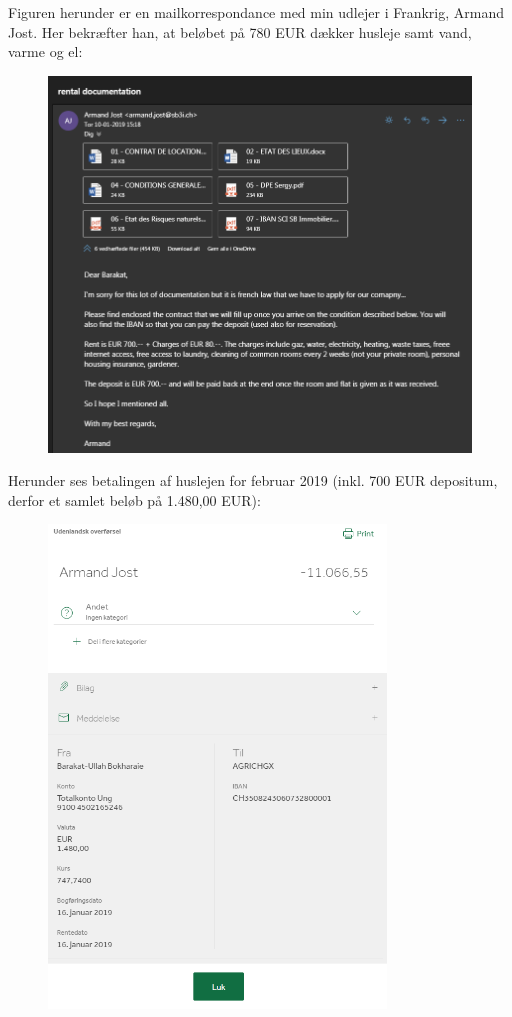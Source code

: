 \documentclass[../Ansoegning.tex]{subfiles}
\begin{document}
Figuren herunder er en mailkorrespondance med min udlejer i Frankrig, Armand Jost. Her bekræfter han, at beløbet på 780 EUR dækker husleje samt vand, varme og el:
\begin{figure}[H]
	\centering
	\includegraphics[width=1.0\textwidth]{Eksterne_filer/leje2.PNG}
\end{figure}
    \newpage
Herunder ses betalingen af huslejen for februar 2019 (inkl. 700 EUR depositum, derfor et samlet beløb på 1.480,00 EUR):
\begin{figure}[H]
	\centering
	\includegraphics[width=0.8\textwidth]{Eksterne_filer/trans2.PNG}
\end{figure}
    \newpage
\end{document}
